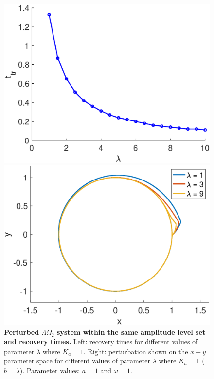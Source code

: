 \begin{figure}[h]
\centering
  \begin{minipage}{0.45\linewidth}
  \centering
    \includegraphics[width=1\linewidth]{Images/photo8_1.eps} 
  \end{minipage} 
  \begin{minipage}{0.45\linewidth}
  \centering
    \includegraphics[width=1\linewidth]{Images/photo8_2.eps} 
  \end{minipage} 
  
  \caption{\textbf{Perturbed $\Lambda \Omega_{2}$ system within the same amplitude level set and recovery times.} Left: recovery times for different values of parameter $\lambda$ where $K_{a} = 1$. Right: perturbation shown on the $x-y$ parameter space for different values of parameter $\lambda$ where $K_{a}=1$ ($b=\lambda$). Parameter values: $a = 1$ and $\omega = 1$.}
  \label{photo8}
\end{figure}


